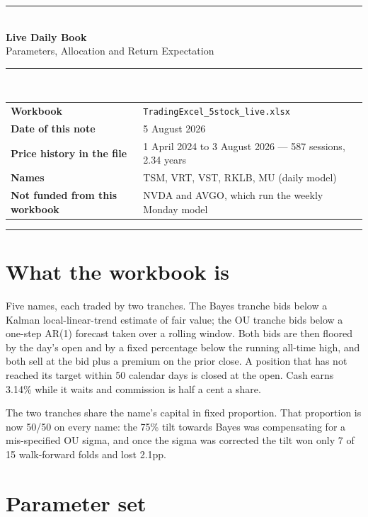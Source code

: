\documentclass[11pt]{article}
\begin{document}
{\color{bcgold}\rule{\textwidth}{1.6pt}}\\[0.3cm]
{\color{bcnavy}\huge\bfseries Live Daily Book}\\[0.15cm]
{\color{bcblue}\Large Parameters, Allocation and Return Expectation}\\[0.35cm]
{\color{bcgold}\rule{\textwidth}{0.8pt}}\\[0.35cm]

\begin{tabular}{@{}ll@{}}
\textbf{Workbook} & \texttt{TradingExcel\_5stock\_live.xlsx} \\
\textbf{Date of this note} & 5 August 2026 \\
\textbf{Price history in the file} & 1 April 2024 to 3 August 2026 --- 587 sessions, 2.34 years \\
\textbf{Names} & TSM, VRT, VST, RKLB, MU (daily model) \\
\textbf{Not funded from this workbook} & NVDA and AVGO, which run the weekly Monday model \\
\end{tabular}

\vspace{0.6em}
{\color{bcrule}\rule{\textwidth}{0.6pt}}

\section{What the workbook is}

Five names, each traded by two tranches. The Bayes tranche bids below a Kalman
local-linear-trend estimate of fair value; the OU tranche bids below a one-step AR(1) forecast
taken over a rolling window. Both bids are then floored by the day's open and by a fixed
percentage below the running all-time high, and both sell at the bid plus a premium on the prior
close. A position that has not reached its target within 50 calendar days is closed at the open.
Cash earns 3.14\% while it waits and commission is half a cent a share.

The two tranches share the name's capital in fixed proportion. That proportion is now 50/50 on
every name: the 75\% tilt towards Bayes was compensating for a mis-specified OU sigma, and once
the sigma was corrected the tilt won only 7 of 15 walk-forward folds and lost 2.1pp.

\section{Parameter set}
\end{document}
